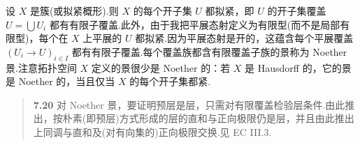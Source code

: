 设 $X$ 是簇(或拟紧概形).则 $X$ 的每个开子集 $U$ 都拟紧，即 $U$ 的开子集覆盖 $U = \bigcup U_i$ 都有有限子覆盖.此外，由于我把平展态射定义为有限型(而不是局部有限型)，每个在 $X$ 上平展的 $U$ 都拟紧.因为平展态射是开的，这蕴含每个平展覆盖 $(U_i \to U)_{i \in I}$ 都有有限子覆盖.每个覆盖族都含有限覆盖子族的景称为 Noether 景.注意拓扑空间 $X$ 定义的景很少是 Noether 的：若 $X$ 是 Hausdorff 的，它的景是 Noether 的，当且仅当 $X$ 的每个开子集都紧.

\begin{quote}
\label{item:7.20}
\textbf{7.20} 对 Noether 景，要证明预层是层，只需对有限覆盖检验层条件.由此推出，按朴素(即预层)方式形成的层的直和与正向极限仍是层，并且由此推出上同调与直和及(对有向集的)正向极限交换.见 EC III.3.
\end{quote}

